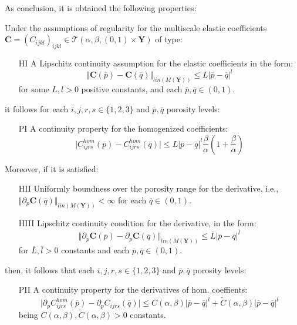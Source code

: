 As conclusion, it is obtained the following properties:
\begin{prop}
Under the assumptions of regularity for the multiscale elastic coefficients $\mathbf{C} = (C_{ijkl})_{ijkl} \in \mathcal{T}(\alpha, \beta, (0,1)\times \mathbf{Y})$ of type:
\begin{enumerate}
    \item[HI] A Lipschitz continuity assumption for the elastic coefficients in the form:
    \begin{equation*}
        \Vert \mathbf{C}(\overline{p}) - \mathbf{C}(\overline{q}) \Vert_{lin(M(\mathbf{Y}))} \leq L \vert \overline{p} - \overline{q} \vert^{l} 
    \end{equation*}
    for some $L, l > 0$ positive constants, and each $\overline{p},\overline{q} \in (0,1)$.
\end{enumerate}
it follows for each $i,j,r,s \in \{1,2,3\}$ and $\overline{p},\overline{q}$ porosity levels:
\begin{enumerate}
    \item[PI] A continuity property for the homogenized coefficients:
    \begin{equation*}
        \vert C_{ijrs}^{hom}(\overline{p})-C^{hom}_{ijrs}(\overline{q}) \vert \leq L \vert \overline{p} - \overline{q} \vert^{l} \frac{\beta}{\alpha} (1+\frac{\beta}{\alpha})
    \end{equation*}
\end{enumerate}

Moreover, if it is satisfied:
\begin{enumerate}
    \item[HII] Uniformly boundness over the porosity range for the derivative, i.e., $\Vert \partial_p \mathbf{C}(\overline{q}) \Vert_{lin(M(\mathbf{Y}))} < \infty$ for each $\overline{q} \in (0,1)$.
    \item[HIII] Lipschitz continuity condition for the derivative, in the form:
    \begin{equation*}
        \Vert \partial_p \mathbf{C}(\overline{p})- \partial_p \mathbf{C}(\overline{q}) \Vert_{lin(M(\mathbf{Y}))} \leq \overline{L} \vert \overline{p}-\overline{q}\vert^{\overline{l}}
    \end{equation*}
    for $\overline{L}, \overline{l} > 0$ constants and each $\overline{p},\overline{q} \in (0,1)$.
\end{enumerate}
then, it follows that each $i,j,r,s \in \{1,2,3\}$ and $\overline{p},\overline{q}$ porosity levels:
\begin{enumerate}
    \item[PII] A continuity property for the derivatives of hom. coeffients:
    \begin{equation*}
        \vert \partial_p C_{ijrs}^{hom}(\overline{p})-\partial_p C_{ijrs}(\overline{q}) \vert \leq C(\alpha, \beta) \vert \overline{p}-\overline{q} \vert^{\overline{l}} + \tilde{C}(\alpha, \beta) \vert \overline{p}-\overline{q} \vert^{l}
    \end{equation*}
    being $C(\alpha,\beta), \tilde{C}(\alpha,\beta) > 0$ constants.
\end{enumerate}
\end{prop}